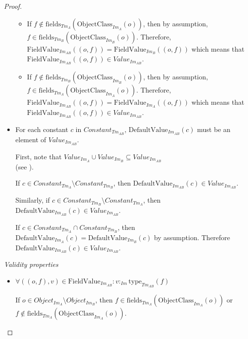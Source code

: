 \begin{proof}
\begin{itemize}
\begin{itemize}
        \item If $f \not\in \mathrm{fields}_{Tm_{A}}(\mathrm{ObjectClass}_{Im_{A}}(o))$, then by assumption, $f \in \mathrm{fields}_{Tm_{B}}(\mathrm{ObjectClass}_{Im_{B}}(o))$. Therefore, $\mathrm{FieldValue}_{Im_{AB}}(( o, f )) = \mathrm{FieldValue}_{Im_{B}}(( o, f ))$ which means that \\$\mathrm{FieldValue}_{Im_{AB}}(( o, f )) \in Value_{Im_{AB}}$.
        
        \item If $f \not\in \mathrm{fields}_{Tm_{B}}(\mathrm{ObjectClass}_{Im_{B}}(o))$, then by assumption, $f \in \mathrm{fields}_{Tm_{A}}(\mathrm{ObjectClass}_{Im_{A}}(o))$. Therefore, $\mathrm{FieldValue}_{Im_{AB}}(( o, f )) = \mathrm{FieldValue}_{Im_{A}}(( o, f ))$ which means that \\$\mathrm{FieldValue}_{Im_{AB}}(( o, f )) \in Value_{Im_{AB}}$.
    \end{itemize}
    
    
    \item For each constant $c$ in $Constant_{Tm_{AB}}$, $\mathrm{DefaultValue}_{Im_{AB}}(c)$ must be an element of $Value_{Im_{AB}}$.
    
    First, note that $Value_{Im_A} \cup Value_{Im_B} \subseteq Value_{Im_{AB}}$\\(see ).
    
    If $c \in Constant_{Tm_A} \setminus Constant_{Tm_B}$, then $\mathrm{DefaultValue}_{Im_{AB}}(c) \in Value_{Im_{AB}}$.
    
    Similarly, if $c \in Constant_{Tm_B} \setminus Constant_{Tm_A}$, then $\mathrm{DefaultValue}_{Im_{AB}}(c) \in Value_{Im_{AB}}$.
    
    If $c \in Constant_{Tm_A} \cap Constant_{Tm_B}$, then $\mathrm{DefaultValue}_{Im_{A}}(c) = \mathrm{DefaultValue}_{Im_{B}}(c)$ by assumption. Therefore $\mathrm{DefaultValue}_{Im_{AB}}(c) \in Value_{Im_{AB}}$.
\end{itemize}

\emph{Validity properties}
\begin{itemize}
    \item $\forall (( o, f ), v ) \in \mathrm{FieldValue}_{Im_{AB}}\!: v:_{Im} \mathrm{type}_{Tm_{AB}}(f)$
    
    If $o \in Object_{Im_A} \setminus Object_{Im_B}$, then $f \in \mathrm{fields}_{Tm_{A}}(\mathrm{ObjectClass}_{Im_{A}}(o))$ or \\$f \not\in \mathrm{fields}_{Tm_{A}}(\mathrm{ObjectClass}_{Im_{A}}(o))$.
    

\end{itemize}
\end{proof}
